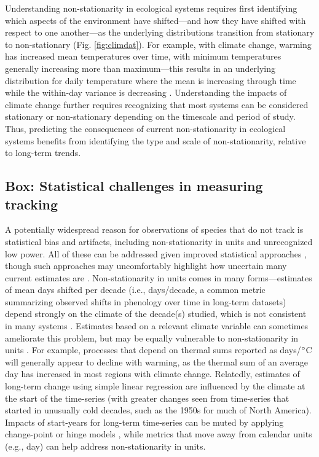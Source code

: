 \documentclass[11pt,letterpaper]{article}
\newcommand{\R}[1]{\label{#1}\linelabel{#1}}
\begin{document}
Understanding non-stationarity in ecological systems requires first identifying which aspects of the environment have shifted---and how they have shifted with respect to one another---as the underlying  distributions transition from stationary to non-stationary (Fig. \ref{fig:climdat}). For example, with climate change, warming has increased mean temperatures over time, with minimum temperatures generally increasing more than maximum---this results in an underlying distribution for daily temperature where the mean is increasing through time while the within-day variance is decreasing \citep{ipcc2013,screen2014}. \R{nsstart} Understanding the impacts of climate change further requires recognizing that most systems can be considered stationary or non-stationary depending on the timescale and period of study. Thus, predicting the consequences of current non-stationarity in ecological systems benefits from identifying the type and scale of non-stationarity, relative to long-term trends. \R{nsend} 

\subsection{Box: Statistical challenges in measuring tracking} %
A potentially widespread reason for observations of species that do not track is statistical bias and artifacts, including non-stationarity in units and unrecognized low power. All of these can be addressed given improved statistical approaches \citep[e.g.,][]{gienapp2005,pearse2017}, though such approaches may uncomfortably highlight how uncertain many current estimates are \citep{brown2016}. Non-stationarity in units comes in many forms---estimates of mean days shifted per decade (i.e., days/decade, a common metric summarizing observed shifts in phenology over time in long-term datasets) depend strongly on the climate of the decade(s) studied, which is not consistent in many systems \citep{Ault2011,McCabe2012}. Estimates based on a relevant climate variable can sometimes ameliorate this problem, but may be equally vulnerable to non-stationarity in units \citep[e.g.,][]{Sagarin:2001fu}. For example, processes that depend on thermal sums reported as days/$\degree$C will generally appear to decline with warming, as the thermal sum of an average day has increased in most regions with climate change. Relatedly, estimates of long-term change using simple linear regression are influenced by the climate at the start of the time-series (with greater changes seen from time-series that started in unusually cold decades, such as the 1950s for much of North America). Impacts of start-years for long-term time-series can be muted by applying change-point or hinge models \citep[e.g.,][]{kharouba2018}, while metrics that move away from calendar units (e.g., day) can help address non-stationarity in units. 
\end{document}
